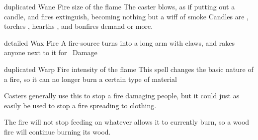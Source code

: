   {duplicated}%
  {Wane}%
  {Fire}%
  {size of the flame}%
  {The caster blows, as if putting out a candle, and  fires extinguish, becoming nothing but a wiff of smoke}%
  {Candles are \tn[6], torches \tn[7], hearths \tn[8], and bonfires demand \tn[9] or more.}

  {detailed}%
  {Wax}%
  {Fire}%
  {}%
  {A fire-source turns into a long arm with claws, and rakes anyone next to it for \showDam~Damage}%
  {}

  {duplicated}%
  {Warp}%
  {Fire}%
  {intensity of the flame}%
  {This spell changes the basic nature of a fire, so it can no longer burn a certain type of material}%
  {Casters generally use this to stop a fire damaging people, but it could just as easily be used to stop a fire spreading to clothing.

    The fire will not stop feeding on whatever allows it to currently burn, so a wood fire will continue burning its wood.}

